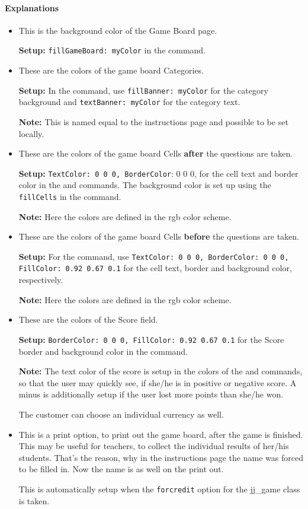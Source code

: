 \documentclass{article}
\newcommand{\NO}[1]{%
\pscircle(0,0){9pt}
\rput(0,0){#1}
}
\def\jj{\textsf{jj\_game}}
\begin{document}
\paragraph{Explanations}
\itemsep18pt
\begin{itemize}
\item[\NO{4}] This is the background color of the Game Board page.

\textbf{Setup:} \texttt{fillGameBoard: myColor} in the  command.
\item[\NO{5}] These are the colors of the game board Categories.

\textbf{Setup:}  In the  command, use \texttt{fillBanner: myColor} for the category
background and \texttt{textBanner: myColor} for the category text.

\textbf{Note:} This is named equal to the instructions page and possible to be set locally.
\item[\NO{6}] These are the colors of the game board Cells \textbf{after} the questions are taken.

\textbf{Setup:} \texttt{TextColor: 0 0 0, BorderColor}: 0 0 0, for
the cell text and border color in the  and 
commands. The background color is set up using the
\texttt{fillCells} in the  command.

\textbf{Note:} Here the colors are defined in the rgb color scheme.
\item[\NO{7}] These are the colors of the game board Cells \textbf{before} the questions are taken.


\textbf{Setup:} For the  command, use
\texttt{TextColor: 0 0 0, BorderColor: 0 0 0, FillColor: 0.92
0.67 0.1} for the cell text, border and background color, respectively.

\textbf{Note:} Here the colors are defined in the rgb color scheme.
\item[\NO{8}] These are the colors of the Score field.

\textbf{Setup:} \texttt{BorderColor: 0 0 0, FillColor: 0.92 0.67 0.1} for the Score border and background color in the  command.

\textbf{Note:} The text color of the score is setup in the colors of the  and  commands, so that the user may quickly see, if she/he is in positive or negative score. A minus is additionally setup if the user lost more points than she/he won.

The customer can choose an individual currency as well.
\item[\NO{9}] This is a print option, to print out the game board, after the game is finished. This may be useful for teachers, to collect the individual results of her/his students. That's the reason, why in the instructions page the name was forced to be filled in. Now the name is as well on the print out.

This is automatically setup when the \texttt{forcredit} option for the {\jj} class is taken.
\end{itemize}
\end{document}
